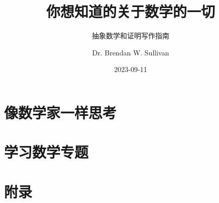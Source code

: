 \documentclass[lang=cn,color=green,10pt]{elegantbook}
\title{你想知道的关于数学的一切}
\subtitle{抽象数学和证明写作指南}
\author{Dr. Brendan W. Sullivan}
\date{2023-09-11}
\begin{document}
\maketitle
\frontmatter

\tableofcontents

\mainmatter

\part{像数学家一样思考}





\part{学习数学专题}



\appendix

\part{附录}




\end{document}
